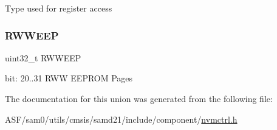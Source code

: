 Type used for register access \mbox{\label{union_n_v_m_c_t_r_l___p_a_r_a_m___type_a28317a7885dcf4d4bd96aace1056de2b}} 
\subsubsection{\texorpdfstring{RWWEEP}{RWWEEP}}
{\footnotesize\ttfamily uint32\+\_\+t R\+W\+W\+E\+EP}

bit\+: 20..31 R\+WW E\+E\+P\+R\+OM Pages 

The documentation for this union was generated from the following file\+:\begin{DoxyCompactItemize}
\item 
A\+S\+F/sam0/utils/cmsis/samd21/include/component/\mbox{\hyperlink{component_2nvmctrl_8h}{nvmctrl.\+h}}\end{DoxyCompactItemize}
